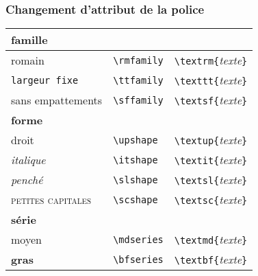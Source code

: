 \begin{frame}[c]

	\frametitle{Changement d'attribut de la police}
	
		\begin{tabularx}{\textwidth}{lYY}
			\hline\hline		
			\textbf{famille}					&										&	\\
			\hline
			\textrm{romain}						&	\texttt{\textbackslash rmfamily}	&	\texttt{\textbackslash textrm\{}\emph{texte}\texttt{\}} \\
			\texttt{largeur fixe}				&	\texttt{\textbackslash ttfamily}	&	\texttt{\textbackslash texttt\{}\emph{texte}\texttt{\}} \\
			\textsf{sans empattements}			&	\texttt{\textbackslash sffamily}	&	\texttt{\textbackslash textsf\{}\emph{texte}\texttt{\}} \\
			\hline
			\textbf{forme}						&										&	\\
			\hline
			\textup{droit}						&	\texttt{\textbackslash upshape}		&	\texttt{\textbackslash textup\{}\emph{texte}\texttt{\}} \\
			\textit{italique}					&	\texttt{\textbackslash itshape}		&	\texttt{\textbackslash textit\{}\emph{texte}\texttt{\}} \\
			\textsl{penché}						&	\texttt{\textbackslash slshape}		&	\texttt{\textbackslash textsl\{}\emph{texte}\texttt{\}} \\
			\textrm{\textsc{petites capitales}}	&	\texttt{\textbackslash scshape}		&	\texttt{\textbackslash textsc\{}\emph{texte}\texttt{\}} \\
			\hline
			\textbf{série}						&										&	\\
			\hline
			\textmd{moyen}						&	\texttt{\textbackslash mdseries}	&	\texttt{\textbackslash textmd\{}\emph{texte}\texttt{\}} \\
			\textbf{gras}						&	\texttt{\textbackslash bfseries}	&	\texttt{\textbackslash textbf\{}\emph{texte}\texttt{\}} \\
			\hline\hline
		\end{tabularx}
\end{frame}


